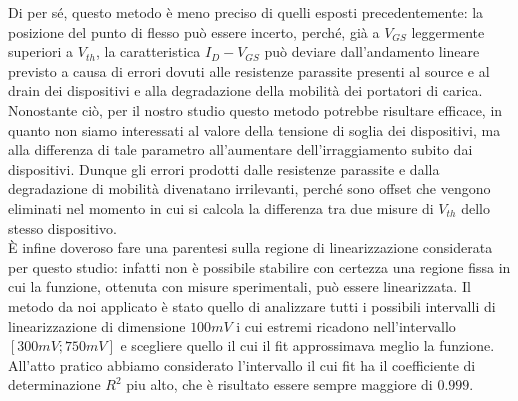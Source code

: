 \documentclass[12pt, letterpaper]{book}
\begin{document}
Di per sé, questo metodo è meno preciso di quelli esposti precedentemente: la posizione del punto di flesso può essere incerto, perché, già a $V_{GS}$ leggermente superiori a $V_{th}$, la caratteristica $I_D-V_{GS}$ può deviare dall'andamento lineare previsto a causa di errori dovuti alle resistenze parassite presenti al source e al drain dei dispositivi e alla degradazione della mobilità dei portatori di carica.
Nonostante ciò, per il nostro studio questo metodo potrebbe risultare efficace, in quanto non siamo interessati al valore della tensione di soglia dei dispositivi, ma alla differenza di tale parametro all'aumentare dell'irraggiamento subito dai dispositivi. Dunque gli errori prodotti dalle resistenze parassite e dalla degradazione di mobilità divenatano irrilevanti, perché sono offset che vengono eliminati nel momento in cui si calcola la differenza tra due misure di $V_{th}$ dello stesso dispositivo.\\
È infine doveroso fare una parentesi sulla regione di linearizzazione considerata per questo studio: infatti non è possibile stabilire con certezza una regione fissa in cui la funzione, ottenuta con misure sperimentali, può essere linearizzata. Il metodo da noi applicato è stato quello di analizzare tutti i possibili intervalli di linearizzazione di dimensione $100 mV$ i cui estremi ricadono nell'intervallo $[300 mV ; 750mV]$ e scegliere quello il cui il fit approssimava meglio la funzione. All'atto pratico abbiamo considerato l'intervallo il cui fit ha il coefficiente di determinazione $R^2$ piu alto, che è risultato essere sempre maggiore di $0.999$.
\end{document}
